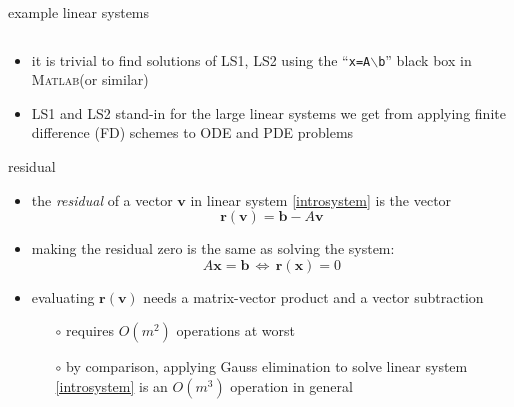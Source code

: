 \documentclass[10pt,hyperref]{beamer}
\newcommand{\bb}{\mathbf{b}}
\newcommand{\br}{\mathbf{r}}
\newcommand{\bx}{\mathbf{x}}
\newcommand{\bv}{\mathbf{v}}
\newcommand{\Matlab}{\textsc{Matlab}\xspace}
\begin{document}
\begin{frame}{example linear systems}
\begin{itemize}
\begin{itemize}
\begin{equation*}
\end{equation*}
  \end{itemize}
\item it is trivial to find solutions of LS1, LS2 using the ``\texttt{x=A$\backslash$b}'' black box in \Matlab (or similar)
\item LS1 and LS2 stand-in for the large linear systems we get from applying finite difference (FD) schemes to ODE and PDE problems
\end{itemize}
\end{frame}


\begin{frame}{residual}

\begin{itemize}
\item the \emph{residual} of a vector $\bv$ in linear system \eqref{introsystem} is the vector
\begin{equation}
\br(\bv) = \bb - A \bv \label{residualdefn}
\end{equation}
\item making the residual zero is the same as solving the system:
      $$A \bx=\bb \, \iff \, \br(\bx)=0$$
\item evaluating $\br(\bv)$ needs a matrix-vector product and a vector subtraction
  \begin{itemize}
  \item[$\circ$] requires $O(m^2)$ operations at worst
  \item[$\circ$] by comparison, applying Gauss elimination to solve linear system \eqref{introsystem} is an $O(m^3)$ operation in general
  \end{itemize}
\end{itemize}
\end{frame}
\end{document}
